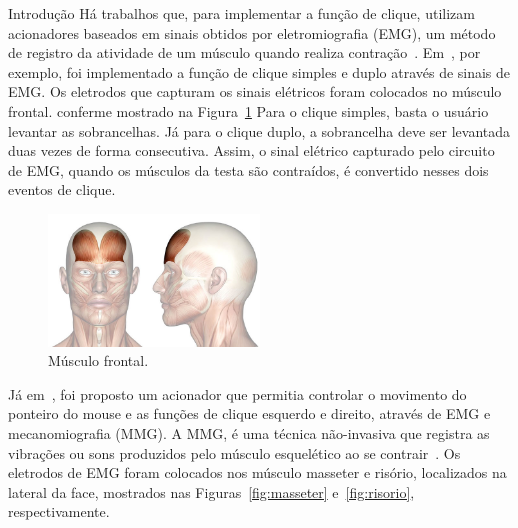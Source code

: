 \begin{chapter}{Introdução}
Há trabalhos que, para implementar a função de clique, utilizam acionadores
baseados em sinais obtidos por eletromiografia (EMG), um método de registro da
atividade de um músculo quando realiza contração~\cite{Amadio07}.
Em~\cite{Pinheiro12}, por exemplo, foi implementado a função de clique simples e
duplo através de sinais de EMG. Os eletrodos que capturam os sinais elétricos
foram colocados no músculo frontal. conferme mostrado na
Figura~\ref{fig:frontal} Para o clique simples, basta o usuário levantar as
sobrancelhas. Já para o clique duplo, a sobrancelha deve ser levantada duas
vezes de forma consecutiva. Assim, o sinal elétrico capturado pelo circuito de
EMG, quando os músculos da testa são contraídos, é convertido nesses dois
eventos de clique.
  
\begin{figure}[!h]
	\centering
	\includegraphics[width=0.5\textwidth]{fig/frontal}
	\caption{Músculo frontal.}
	\label{fig:frontal}
\end{figure}

Já em~\cite{Kaushik12}, foi proposto um acionador que permitia controlar o
movimento do ponteiro do mouse e as funções de clique esquerdo e direito,
através de EMG e mecanomiografia (MMG). A MMG, é uma técnica não-invasiva que
registra as vibrações ou sons produzidos pelo músculo esquelético ao se
contrair~\cite{Vaz99}. Os eletrodos de EMG foram colocados nos músculo masseter
e risório, localizados na lateral da face, mostrados nas
Figuras~\ref{fig:masseter} e~\ref{fig:risorio}, respectivamente. 



\end{chapter}
